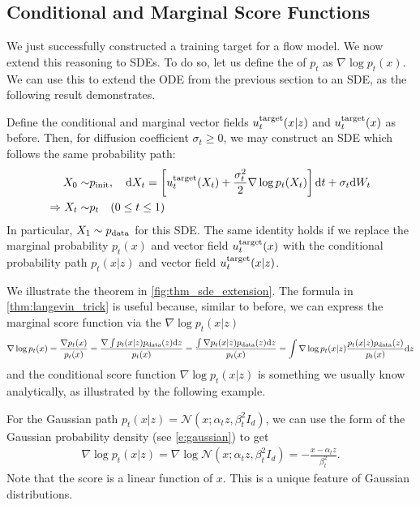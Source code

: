 \subsection{Conditional and Marginal Score Functions}
We just successfully constructed a training target for a flow model. We now extend this reasoning to SDEs. To do so, let us define the  of $p_t$ as $\nabla\log p_t(x)$. We can use this to extend the ODE from the previous section to an SDE, as the following result demonstrates.
\begin{theorem}
\label{thm:langevin_trick}
Define the conditional and marginal vector fields $u^{\text{target}}_t(x|z)$ and $u^{\text{target}}_t(x)$ as before. Then, for diffusion coefficient $\sigma_t\geq 0$, we may construct an SDE which follows the same probability path:
\begin{align}
\label{eq:sde_extension}
    X_0\sim&p_{\rm{init}},\quad \mathrm{d} X_t =\left[u^{\text{target}}_t(X_t)+\frac{\sigma_t^2}{2}\nabla\log p_t(X_t)\right]\mathrm{d} t +\sigma_t\mathrm{d} W_t\\
    \label{eq:marginal_ode_follows_marginal_path_sde}
    \Rightarrow X_t\sim& p_t\quad (0\leq t\leq 1)
\end{align}
In particular, $X_1\sim p_{\rm{data}}$ for this SDE. The same identity holds if we replace the marginal probability $p_t(x)$ and vector field $u^{\text{target}}_t(x)$ with the conditional probability path $p_t(x|z)$ and vector field $u^{\text{target}}_t(x|z)$.
\end{theorem}
We illustrate the theorem in \cref{fig:thm_sde_extension}. The formula in \cref{thm:langevin_trick} is useful because, similar to before, we can express the marginal score function via the  $\nabla\log p_t(x|z)$
\begin{align}
\label{e:marginal_score}
\nabla\log p_t(x) = \frac{\nabla p_t(x)}{p_t(x)}
=\frac{\nabla \int p_t(x|z)p_{\rm{data}}(z)\mathrm{d} z}{p_t(x)}
=\frac{\int \nabla p_t(x|z)p_{\rm{data}}(z)\mathrm{d} z}{p_t(x)}
=\int \nabla \log p_t(x|z)\frac{ p_t(x|z)p_{\rm{data}}(z)}{p_t(x)}\mathrm{d} z
\end{align}
and the conditional score function $\nabla \log p_t(x|z)$ is something we usually know analytically, as illustrated by the following example.
\begin{examplebox} 
For the Gaussian path $p_t(x|z)=\mathcal{N}(x;\alpha_t z,\beta_t^2 I_d)$, we can use the form of the Gaussian probability density (see \cref{e:gaussian}) to get
\begin{align}
\label{eq:cond_score_gaussian}
    \nabla \log p_t(x|z) = \nabla\log \mathcal{N}(x;\alpha_t z,\beta_t^2 I_d) = -\frac{x-\alpha_t z}{\beta_t^2}.
\end{align}
Note that the score is a linear function of $x$. This is a unique feature of Gaussian distributions.
\end{examplebox}
